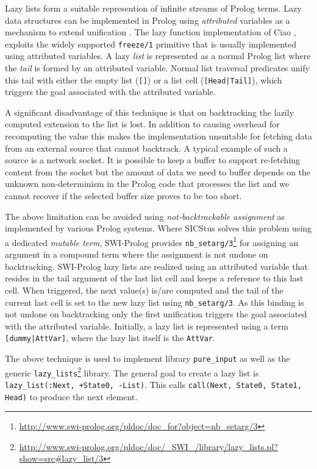 \documentclass{new_tlp}
\begin{document}
Lazy lists form a suitable represention of infinite streams of Prolog
terms. Lazy data structures can be implemented in Prolog using
\emph{attributed} variables as a mechanism to extend unification
\cite{10.1007/3-540-55844-6_141}. The lazy function implementation of
Ciao \cite{casas2005functional,lazyCiao}, exploits the widely supported
\texttt{freeze/1} primitive that is usually implemented using attributed
variables. A lazy \emph{list} is represented as a normal Prolog list where the
\emph{tail} is formed by an attributed variable. Normal list traversal
predicates unify this tail with either the empty list (\texttt{[]}) or a
list cell (\texttt{[Head|Tail]}), which triggers the goal associated
with the attributed variable.

A significant disadvantage of this technique is that on backtracking the
lazily computed extension to the list is lost. In addition to causing
overhead for recomputing the value this makes the implementation
unsuitable for fetching data from an external source that cannot
backtrack. A typical example of such a source is a network socket. It is
possible to keep a buffer to support re-fetching content from the socket
but the amount of data we need to buffer depends on the unknown
non-determinism in the Prolog code that processes the list and we cannot
recover if the selected buffer size proves to be too short.

The above limitation can be avoided using \emph{not-backtrackable
assignment} as implemented by various Prolog systems. Where SICStus
solves this problem using a dedicated \emph{mutable term}, SWI-Prolog
provides
\texttt{nb\_setarg/3}\footnote{\url{http://www.swi-prolog.org/pldoc/doc_for?object=nb_setarg/3}}
for assigning an argument in a compound term where the assignment is not
undone on backtracking. SWI-Prolog lazy lists are realized using an
attributed variable that resides in the tail argument of the last list
cell and keeps a reference to this last cell. When triggered, the next
value(s) is/are computed and the tail of the current last cell is set to
the new lazy list using \texttt{nb\_setarg/3}. As this binding is not
undone on backtracking only the first unification triggers the goal
associated with the attributed variable. Initially, a lazy list is
represented using a term \texttt{[dummy|AttVar]}, where the lazy list
itself is the  \texttt{AttVar}.

The above technique is used to implement library \texttt{pure\_input} as
well as the generic
\texttt{lazy\_lists}\footnote{\url{http://www.swi-prolog.org/pldoc/doc/_SWI_/library/lazy_lists.pl?show=src#lazy_list/3}}
library. The general goal to create a lazy list is
\texttt{lazy\_list(:Next, +State0, -List)}. This calls
\texttt{call(Next, State0, State1, Head)} to produce the next element.
\end{document}
